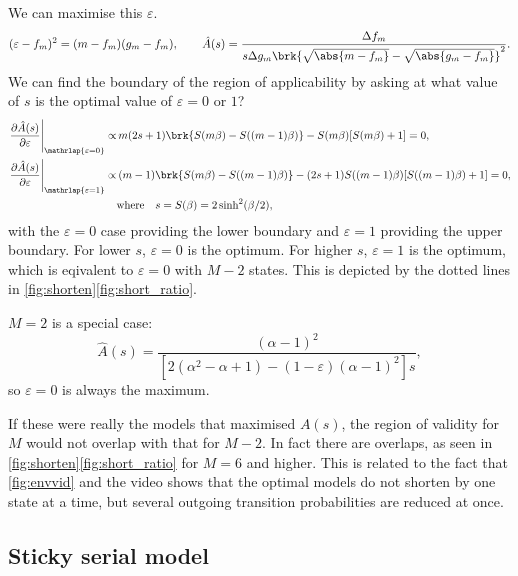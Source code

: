 \documentclass[12pt]{article}
\renewcommand{\pdiff}[2]{\frac{\partial #1}{\partial #2}}
\begin{document}
We can maximise this \wrt $\varepsilon$.
%
\begin{equation}\label{eq:shortopt}
  (\varepsilon - f_m)^2 = (m - f_m)(g_m - f_m),
  \qquad
  \hat{A}(s) = \frac{\Delta f_{m}}
      {s \Delta g_{m} \brk{\sqrt{\abs{m - f_m}} - \sqrt{\abs{g_m - f_m}}}^2}.
\end{equation}
%
We can find the boundary of the region of applicability by asking at what value of $s$ is the optimal value of $\varepsilon=0$ or $1$?
%
\begin{equation}\label{eq:shortenvalid}
\begin{aligned}
  \left.\pdiff{\hat{A}(s)}{\varepsilon}\right|_{\mathrlap{\varepsilon=0}} \propto &\,
    m(2s+1) \brk{S(m\beta) - S((m-1)\beta)} - S(m\beta) [S(m\beta) + 1]
      = 0,\\
  \left.\pdiff{\hat{A}(s)}{\varepsilon}\right|_{\mathrlap{\varepsilon=1}} \propto &\,
    (m-1)\brk{S(m\beta) - S((m-1)\beta)} - (2s+1) S((m-1)\beta) [S((m-1)\beta) + 1]
      = 0,\\
    &\text{where}\quad
    s = S(\beta) = 2 \sinh^2(\beta/2),
\end{aligned}
\end{equation}
%
with the $\varepsilon=0$ case providing the lower boundary and $\varepsilon=1$ providing the upper boundary.
For lower \(s\), \(\varepsilon = 0\) is the optimum. 
For higher \(s\), \(\varepsilon = 1\) is the optimum, which is eqivalent to \(\varepsilon = 0\) with \(M-2\) states.
This is depicted by the dotted lines in \cref{fig:shorten}\ref{fig:short_ratio}.

\(M=2\) is a special case:
%
\begin{equation*}
  \hat{A}(s) = \frac{(\alpha-1)^2}
                    {[2(\alpha^2-\alpha+1) - (1-\varepsilon) (\alpha-1)^2]s},
\end{equation*}
%
so \(\varepsilon=0\) is always the maximum.

If these were really the models that maximised $A(s)$, the region of validity for $M$ would not overlap with that for $M-2$.
In fact there are overlaps, as seen in \cref{fig:shorten}\ref{fig:short_ratio} for \(M=6\) and higher.
This is related to the fact that \autoref{fig:envvid} and the video shows that the optimal models do not shorten by one state at a time, but several outgoing transition probabilities are reduced at once.


\subsection{Sticky serial model}\label{sec:serial_sticky}
\end{document}
